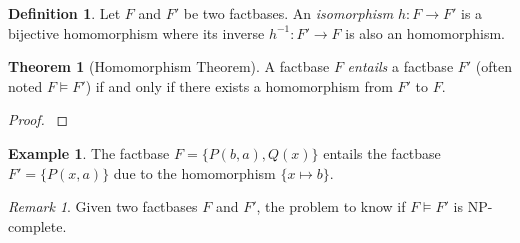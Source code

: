 \documentclass{article}
\theoremstyle{definition}
\newtheorem{definition}{Definition}[section]
\newtheorem{theorem}{Theorem}[section]
\newtheorem{example}{Example}[section]
\theoremstyle{remark}
\newtheorem{remark}{Remark}[section]
\begin{document}
\begin{definition}
Let $F$ and $F'$ be two factbases. An \emph{isomorphism} $h:F \to F'$ is a bijective homomorphism where its inverse $h^{-1}:F' \to F$ is also an homomorphism. 
\end{definition}


\begin{theorem}[Homomorphism Theorem]
A factbase $F$ \emph{entails} a factbase $F'$ (often noted $F \models F'$) if and only if there exists a homomorphism from $F'$ to $F$.
\end{theorem}

\begin{proof}
\cite{base}
\end{proof}

\begin{example}
The factbase $F = \{P(b,a),Q(x)\}$ entails the factbase $F' = \{P(x,a)\}$ due to the homomorphism $\{x \mapsto b\}$.
\end{example}

\begin{remark}
Given two factbases $F$ and $F'$, the problem to know if $F \models F'$ is NP-complete.
\end{remark}
\end{document}
